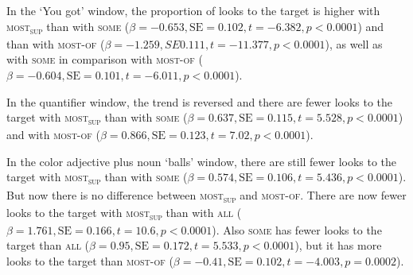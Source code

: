 \documentclass[output=paper]{langscibook}
\begin{document}
In the `You got' window, the proportion of looks to the target is higher with \textsc{most\textsubscript{sup}} than with
\textsc{some} ($\beta =-0.653, \text{SE}=0.102, t=-6.382, p<0.0001$) and than with
\textsc{most-of} ($\beta =-1.259, SE 0.111, t=-11.377, p<0.0001$), as well as with
\textsc{some} in comparison with \textsc{most-of} ($\beta =-0.604, \text{SE}=0.101, t=-6.011,\allowbreak
p<0.0001$).

In the quantifier window, the trend is reversed and there are fewer looks to the target with
\textsc{most\textsubscript{sup}} than with \textsc{some} ($\beta =0.637, \text{SE}=0.115, t=5.528,
p<0.0001$) and with \textsc{most-of} ($\beta =0.866, \text{SE}=0.123, t=7.02,
p<0.0001$).

In the color adjective plus noun `balls' window, there are still fewer looks to the target with
\textsc{most\textsubscript{sup}} than with \textsc{some} ($\beta =0.574, \text{SE}=0.106, t=5.436,\allowbreak
p<0.0001$). But now there is no difference between \textsc{most\textsubscript{sup}} and
\textsc{most-of}. There are now fewer looks to the target with \textsc{most\textsubscript{sup}} than with \textsc{all}
($\beta =1.761,\allowbreak \text{SE}=0.166, t=10.6, p<0.0001$). Also \textsc{some} has fewer looks to the
target than \textsc{all} ($\beta =0.95, \text{SE}=0.172, t=5.533, p<0.0001$), but it has more
looks to the target than \textsc{most-of} ($\beta =-0.41, \text{SE}=0.102, t=-4.003, p=0.0002$).

\end{document}
